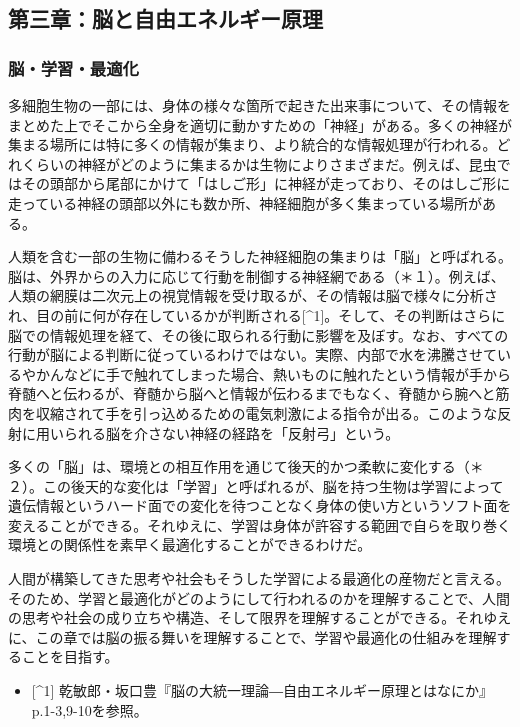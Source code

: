 \subsection{第三章：脳と自由エネルギー原理}\label{ux7b2cux4e09ux7ae0ux8133ux3068ux81eaux7531ux30a8ux30cdux30ebux30aeux30fcux539fux7406}

\subsubsection{脳・学習・最適化}\label{ux8133ux5b66ux7fd2ux6700ux9069ux5316}

多細胞生物の一部には、身体の様々な箇所で起きた出来事について、その情報をまとめた上でそこから全身を適切に動かすための「神経」がある。多くの神経が集まる場所には特に多くの情報が集まり、より統合的な情報処理が行われる。どれくらいの神経がどのように集まるかは生物によりさまざまだ。例えば、昆虫ではその頭部から尾部にかけて「はしご形」に神経が走っており、そのはしご形に走っている神経の頭部以外にも数か所、神経細胞が多く集まっている場所がある。

人類を含む一部の生物に備わるそうした神経細胞の集まりは「脳」と呼ばれる。脳は、外界からの入力に応じて行動を制御する神経網である（＊１）。例えば、人類の網膜は二次元上の視覚情報を受け取るが、その情報は脳で様々に分析され、目の前に何が存在しているかが判断される{[}\^{}1{]}。そして、その判断はさらに脳での情報処理を経て、その後に取られる行動に影響を及ぼす。なお、すべての行動が脳による判断に従っているわけではない。実際、内部で水を沸騰させているやかんなどに手で触れてしまった場合、熱いものに触れたという情報が手から脊髄へと伝わるが、脊髄から脳へと情報が伝わるまでもなく、脊髄から腕へと筋肉を収縮されて手を引っ込めるための電気刺激による指令が出る。このような反射に用いられる脳を介さない神経の経路を「反射弓」という。

多くの「脳」は、環境との相互作用を通じて後天的かつ柔軟に変化する（＊２）。この後天的な変化は「学習」と呼ばれるが、脳を持つ生物は学習によって遺伝情報というハード面での変化を待つことなく身体の使い方というソフト面を変えることができる。それゆえに、学習は身体が許容する範囲で自らを取り巻く環境との関係性を素早く最適化することができるわけだ。

人間が構築してきた思考や社会もそうした学習による最適化の産物だと言える。そのため、学習と最適化がどのようにして行われるのかを理解することで、人間の思考や社会の成り立ちや構造、そして限界を理解することができる。それゆえに、この章では脳の振る舞いを理解することで、学習や最適化の仕組みを理解することを目指す。

\begin{itemize}
\tightlist
\item
  {[}\^{}1{]}
  乾敏郎・坂口豊『脳の大統一理論―自由エネルギー原理とはなにか』p.1-3,9-10を参照。
\end{itemize}

